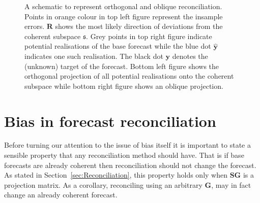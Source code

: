 \documentclass[12pt]{article}
\theoremstyle{definition}
\theoremstyle{property}
\begin{document}
\begin{figure}
		\caption{A schematic to represent orthogonal and oblique reconciliation.  Points in orange colour in top left figure represent the insample errors. $\bm{R}$ shows the most likely direction of deviations from the coherent subspace $\mathfrak{s}$. Grey points in top right figure indicate  potential realisations of the base forecast while the blue dot ${\hat{\bm y}}$ indicates one such realisation. The black dot ${\bm y}$ denotes the (unknown) target of the forecast. Bottom left figure shows the orthogonal projection of all potential realisations onto the coherent subspace while bottom right figure shows an oblique projection.} \label{fig:OthogonalVSOblique_projection}
	\end{figure}



	
%			
	

	
	\section{Bias in forecast reconciliation}\label{sec:BiasInRecon}
	
	Before turning our attention to the issue of bias itself it is important to state a sensible property that any reconciliation method should have.  That is if base forecasts are already coherent then reconciliation should not change the forecast.  As stated in Section~\ref{sec:Reconciliation}, this property holds only when $\bm{SG}$ is a projection matrix.  As a corollary, reconciling using an arbitrary $\bm{G}$,  may in fact change an already coherent forecast.
	
\end{document}
